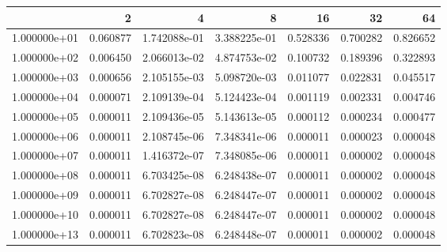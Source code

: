\begin{tabular}{lrrrrrr}
\toprule
{} &        2  &            4  &            8  &        16 &        32 &        64 \\
\midrule
1.000000e+01 &  0.060877 &  1.742088e-01 &  3.388225e-01 &  0.528336 &  0.700282 &  0.826652 \\
1.000000e+02 &  0.006450 &  2.066013e-02 &  4.874753e-02 &  0.100732 &  0.189396 &  0.322893 \\
1.000000e+03 &  0.000656 &  2.105155e-03 &  5.098720e-03 &  0.011077 &  0.022831 &  0.045517 \\
1.000000e+04 &  0.000071 &  2.109139e-04 &  5.124423e-04 &  0.001119 &  0.002331 &  0.004746 \\
1.000000e+05 &  0.000011 &  2.109436e-05 &  5.143613e-05 &  0.000112 &  0.000234 &  0.000477 \\
1.000000e+06 &  0.000011 &  2.108745e-06 &  7.348341e-06 &  0.000011 &  0.000023 &  0.000048 \\
1.000000e+07 &  0.000011 &  1.416372e-07 &  7.348085e-06 &  0.000011 &  0.000002 &  0.000048 \\
1.000000e+08 &  0.000011 &  6.703425e-08 &  6.248438e-07 &  0.000011 &  0.000002 &  0.000048 \\
1.000000e+09 &  0.000011 &  6.702827e-08 &  6.248447e-07 &  0.000011 &  0.000002 &  0.000048 \\
1.000000e+10 &  0.000011 &  6.702827e-08 &  6.248447e-07 &  0.000011 &  0.000002 &  0.000048 \\
1.000000e+13 &  0.000011 &  6.702823e-08 &  6.248448e-07 &  0.000011 &  0.000002 &  0.000048 \\
\bottomrule
\end{tabular}
